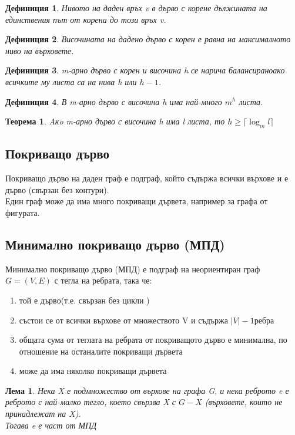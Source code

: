 \documentclass[fleqn, 12pt]{article}
\newtheorem{definition}{Дефиниция}[subsection]
\newtheorem{theorem}{Теорема}[subsection]
\newtheorem{lemma}{Лема}[subsection]
\theoremstyle{definition}
\begin{document}
\begin{definition}
Нивото на даден връх v в дърво с корене дължината на единствения път от корена до този връх v.
\end{definition}

\begin{definition}
Височината на дадено дърво с корен е равна на максималното ниво на върховете.
\end{definition}

\begin{definition}
m-арно дърво с корен и височина h се нарича балансираноако всичките му листа са на нива h или $h - 1$.
\end{definition}

\begin{definition}
В m-арно дърво с височина h има най-много $m^h$ листа.
\end{definition}

\begin{theorem}
Aкo m-арно дърво с височина h има l листа, то $h \geq \lceil \log_{m}{l} \rceil$
\end{theorem}

\subsection{Покриващо дърво}
Покриващо дърво на даден граф е подграф, който съдържа всички върхове и е дърво (свързан без контури).\\
Един граф може да има много покриващи дървета, например за графа от фигурата.

\subsection{Минимално покриващо дърво (МПД)}
Минимално покриващо дърво (МПД) е подграф на неориентиран граф $G=(V,E)$ с тегла на ребрата, така че:
\begin{enumerate}
\item той е дърво(т.е. свързан без цикли )
\item състои се от всички върхове от множеството V и съдържа $|V| - 1$ребра
\item общата сума от теглата на ребрата от покриващото дърво е минимална, по отношение на останалите покриващи дървета
\item може да има няколко покриващи дървета
\end{enumerate}

\begin{lemma}
Нека X е подмножество от върхове на графа G, и нека реброто e е реброто с най-малко тегло, което свързва X с $G-X$ (върховете, които не принадлежат на X).\\
Тогава e е част от МПД
\end{lemma}
\end{document}
